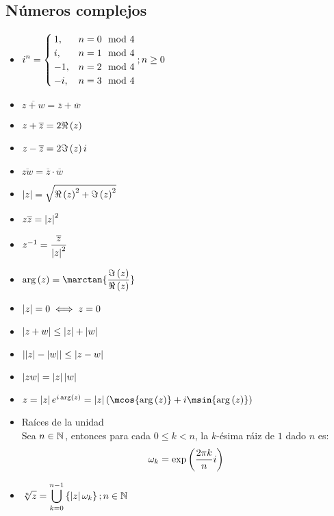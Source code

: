 \subsection{Números complejos}
\begin{itemize}
	\item $\displaystyle i^{n} =
	\begin{cases}
		1, & n = 0\mod 4\\
		i, & n = 1\mod 4\\
		-1, & n = 2\mod 4\\
		-i, & n = 3\mod 4
	\end{cases}; n\geq 0
	$
	\item $\overline{z + w} =\overline{z} +\overline{w}$
	\item $z +\overline{z} = 2\rpart{z}$
	\item $z -\overline{z} = 2\ipart{z}i$
	\item $\overline{zw} =\overline{z}\cdot\overline{w}$
	\item $\abs{z} =\sqrt{\rpart{z}^{2} +\ipart{z}^{2}}$
	\item $z\overline{z} =\left\vert z \right\vert^{2}$
	\item $\minv{z} =\dfrac{\overline{z}}{\abs{z}^{2}}$
	\item $\marg{z} =\marctan{\dfrac{\ipart{z}}{\rpart{z}}}$
	\item $\left\vert z \right\vert = 0\iff z = 0$
	\item $\left\vert z + w \right\vert\leq\left\vert z \right\vert +\left\vert w \right\vert$
	\item $\left\vert \left\vert z \right\vert -\left\vert w \right\vert \right\vert\leq\left\vert z - w \right\vert$
	\item $\left\vert zw \right\vert =\left\vert z \right\vert\left\vert w \right\vert$
	\item $z =\abs{z}e^{i\marg{z}} =\abs{z}\pa{\mcos{\marg{z}} +i\msin{\marg{z}}}$
	\item Raíces de la unidad\\
	Sea $n\in\mathbb{N}^{}$, entonces para cada $0\leq k < n$, la $k$-ésima ráiz de $1$ dado $n$ es:
	\[ \omega_{k} =\mexp{\dfrac{2\pi k}{n}i} \]
	\item $\displaystyle\sqrt[n]{z} =\bigcup_{k = 0}^{n - 1}\left\{ \left\vert z \right\vert\omega_{k} \right\}; n\in\mathbb{N}^{}$
\end{itemize}